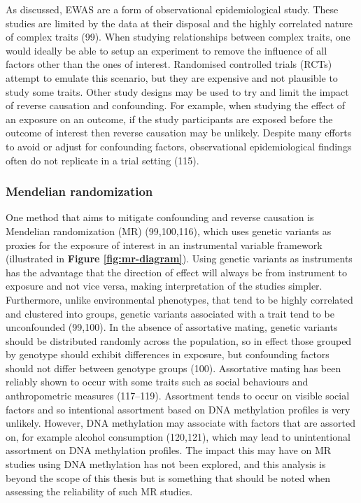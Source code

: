 \documentclass[11pt,oneside]{bristolthesis}
\begin{document}
As discussed, EWAS are a form of observational epidemiological study. These studies are limited by the data at their disposal and the highly correlated nature of complex traits (99). When studying relationships between complex traits, one would ideally be able to setup an experiment to remove the influence of all factors other than the ones of interest. Randomised controlled trials (RCTs) attempt to emulate this scenario, but they are expensive and not plausible to study some traits. Other study designs may be used to try and limit the impact of reverse causation and confounding. For example, when studying the effect of an exposure on an outcome, if the study participants are exposed before the outcome of interest then reverse causation may be unlikely. Despite many efforts to avoid or adjust for confounding factors, observational epidemiological findings often do not replicate in a trial setting (115).

\hypertarget{mr-01}{%
\subsubsection{Mendelian randomization}\label{mr-01}}

One method that aims to mitigate confounding and reverse causation is Mendelian randomization (MR) (99,100,116), which uses genetic variants as proxies for the exposure of interest in an instrumental variable framework (illustrated in \textbf{Figure \ref{fig:mr-diagram}}). Using genetic variants as instruments has the advantage that the direction of effect will always be from instrument to exposure and not vice versa, making interpretation of the studies simpler. Furthermore, unlike environmental phenotypes, that tend to be highly correlated and clustered into groups, genetic variants associated with a trait tend to be unconfounded (99,100). In the absence of assortative mating, genetic variants should be distributed randomly across the population, so in effect those grouped by genotype should exhibit differences in exposure, but confounding factors should not differ between genotype groups (100). Assortative mating has been reliably shown to occur with some traits such as social behaviours and anthropometric measures (117--119). Assortment tends to occur on visible social factors and so intentional assortment based on DNA methylation profiles is very unlikely. However, DNA methylation may associate with factors that are assorted on, for example alcohol consumption (120,121), which may lead to unintentional assortment on DNA methylation profiles. The impact this may have on MR studies using DNA methylation has not been explored, and this analysis is beyond the scope of this thesis but is something that should be noted when assessing the reliability of such MR studies.
\end{document}
